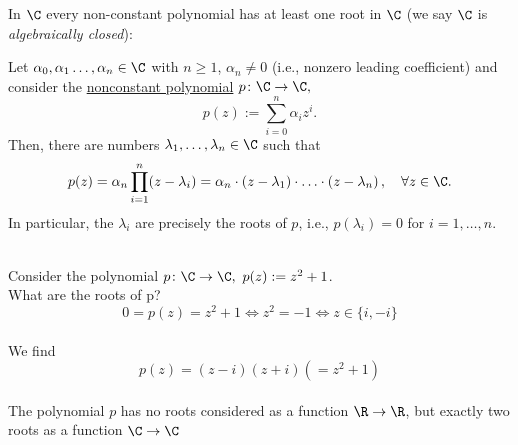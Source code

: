 \begin{frame}
In $\C$ every non-constant polynomial has at least one root in $\C$ (we say $\C$ is \textit{algebraically closed}): \vspace{-0.2cm}
\begin{theo}\label{theo:fundalg}
	Let $\alpha_0,\alpha_1\ldots, \alpha_n\in \C$ with $n\geq 1$, $\alpha_n \neq 0$ (i.e., nonzero leading coefficient) and consider the \underline{nonconstant polynomial} $p\colon \C \to \C,$	
	$$p(z):=\sum_{i=0}^n\alpha_iz^i.$$
	Then, there are numbers $\lambda_1,\ldots, \lambda_n\in \C$ such that
	\[
	p(z)=\alpha_n \prod_{i=1}^{n} (z-\lambda_i)=\alpha_n\cdot (z-\lambda_1)\cdot\ldots\cdot (z-\lambda_n)\, ,\  ~~\forall z\in\C.
	\]
	 In particular, the $\lambda_i$ are precisely the roots of $p$, i.e., $p(\lambda_i) = 0$ for $i=1,\ldots,n$.
\end{theo}

\vspace{0.6cm}
\begin{ex} 
	\blank
	~\\
	Consider the polynomial $p\colon\C\to\C,~p(z) := z^2 +1$.\\
	
	What are the roots of p?  
	$$0=p(z)=z^2 +1   \Leftrightarrow z^2 = -1 \Leftrightarrow z \in \{i,-i\}$$
	~\\
	We find
	$$p(z) = (z-i)(z+i) (=z^2+1) $$
	~\\
	The polynomial $p$ has no roots considered as a function $\R\to\R$, but exactly two roots as a function $\C\to\C$
\end{ex}
\end{frame}



